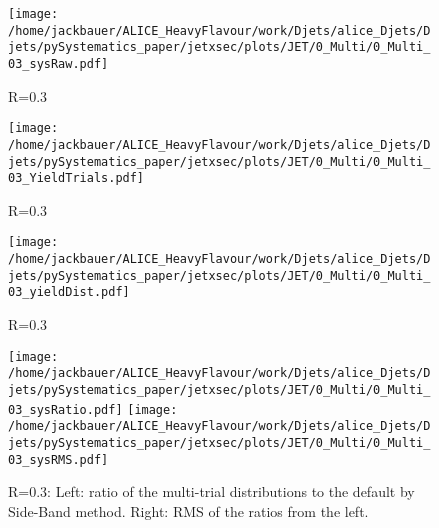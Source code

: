 \begin{figure}[bth]
\centering
\texttt{[image: /home/jackbauer/ALICE\_HeavyFlavour/work/Djets/alice\_Djets/Djets/pySystematics\_paper/jetxsec/plots/JET/0\_Multi/0\_Multi\_03\_sysRaw.pdf]}
\caption{R=0.3}
\label{fig:MTYieldsPerDptBin_pp_DzeroR03}
\end{figure}
\begin{figure}[bth]
\centering
\texttt{[image: /home/jackbauer/ALICE\_HeavyFlavour/work/Djets/alice\_Djets/Djets/pySystematics\_paper/jetxsec/plots/JET/0\_Multi/0\_Multi\_03\_YieldTrials.pdf]}
\caption{R=0.3
}
\label{fig:MTYieldsPerJetBin_pp_DzeroR03}
\end{figure}
\begin{figure}[bth]
\centering
\texttt{[image: /home/jackbauer/ALICE\_HeavyFlavour/work/Djets/alice\_Djets/Djets/pySystematics\_paper/jetxsec/plots/JET/0\_Multi/0\_Multi\_03\_yieldDist.pdf]}
\caption{R=0.3}
\label{fig:MTYieldDistPerJetBin_pp_DzeroR03}
\end{figure}
\begin{figure}[bth]
\centering
\texttt{[image: /home/jackbauer/ALICE\_HeavyFlavour/work/Djets/alice\_Djets/Djets/pySystematics\_paper/jetxsec/plots/JET/0\_Multi/0\_Multi\_03\_sysRatio.pdf]}
\texttt{[image: /home/jackbauer/ALICE\_HeavyFlavour/work/Djets/alice\_Djets/Djets/pySystematics\_paper/jetxsec/plots/JET/0\_Multi/0\_Multi\_03\_sysRMS.pdf]}
\caption{R=0.3: Left: ratio of the multi-trial distributions to the default by Side-Band method. Right: RMS of the ratios from the left. 
}
\label{fig:MTRatioRMS_pp_DzeroR03}
\end{figure}

